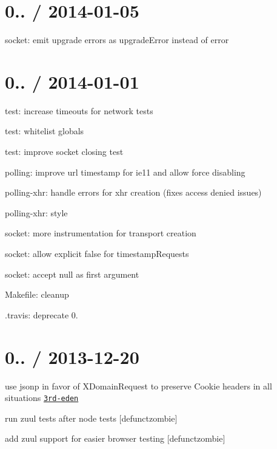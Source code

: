 \section*{0.. / 2014-\/01-\/05 }


\begin{DoxyItemize}
\item socket\+: emit upgrade errors as {\ttfamily upgrade\+Error} instead of {\ttfamily error}
\end{DoxyItemize}

\section*{0.. / 2014-\/01-\/01 }


\begin{DoxyItemize}
\item test\+: increase timeouts for network tests
\item test\+: whitelist globals
\item test\+: improve socket closing test
\item polling\+: improve url timestamp for ie11 and allow force disabling
\item polling-\/xhr\+: handle errors for xhr creation (fixes {\ttfamily access denied} issues)
\item polling-\/xhr\+: style
\item socket\+: more instrumentation for transport creation
\item socket\+: allow explicit {\ttfamily false} for {\ttfamily timestamp\+Requests}
\item socket\+: accept {\ttfamily null} as first argument
\item Makefile\+: cleanup
\item .travis\+: deprecate 0.
\end{DoxyItemize}

\section*{0.. / 2013-\/12-\/20 }


\begin{DoxyItemize}
\item use {\ttfamily jsonp} in favor of {\ttfamily X\+Domain\+Request} to preserve {\ttfamily Cookie} headers in all situations \href{fixes #217}{\tt 3rd-\/eden}
\item run zuul tests after node tests \mbox{[}defunctzombie\mbox{]}
\item add zuul support for easier browser testing \mbox{[}defunctzombie\mbox{]}
\end{DoxyItemize}

